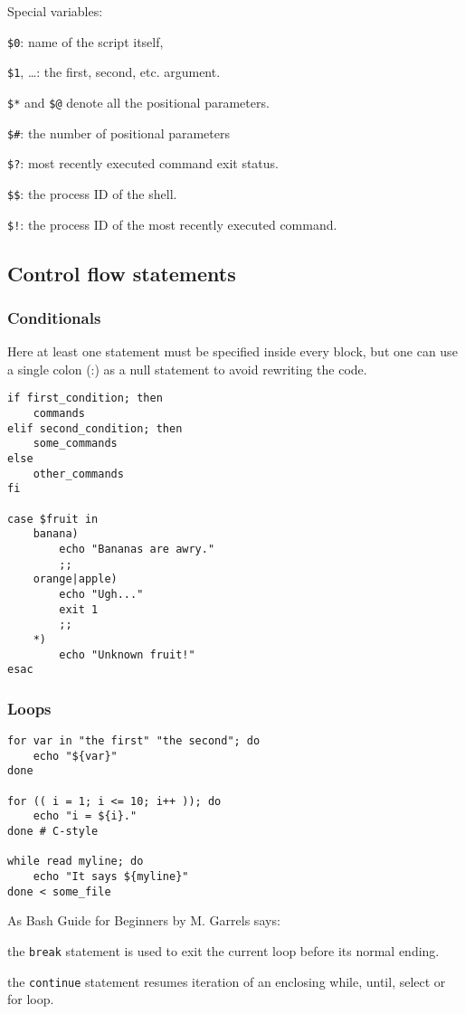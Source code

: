 Special variables:
\begin{enumx}
	\item \texttt{\$0}: name of the script itself,
	\item \texttt{\$1}, \ldots: the first, second, etc. argument.
	\item \texttt{\$*} and \texttt{\$@} denote all the positional parameters.
	\item \texttt{\$\#}: the number of positional parameters
	\item \texttt{\$?}: most recently executed command exit status.
	\item \texttt{\$\$}: the process ID of the shell.
	\item \texttt{\$!}: the process ID of the most recently executed command.
\end{enumx}

\subsection{Control flow statements}
\subsubsection{Conditionals}
Here at least one statement must be specified inside every block,
but one can use a single colon (:) as a null statement to avoid
rewriting the code.

\begin{verbatim}
if first_condition; then
    commands
elif second_condition; then
    some_commands
else
    other_commands	
fi

case $fruit in
    banana)
        echo "Bananas are awry."
        ;;
    orange|apple)
        echo "Ugh..."
        exit 1
        ;;
    *)
        echo "Unknown fruit!"
esac
\end{verbatim}

\subsubsection{Loops}
\begin{verbatim}
for var in "the first" "the second"; do
    echo "${var}"
done

for (( i = 1; i <= 10; i++ )); do
    echo "i = ${i}."
done # C-style

while read myline; do
    echo "It says ${myline}"
done < some_file
\end{verbatim}

As Bash Guide for Beginners by M. Garrels says:
\begin{enumx}
\item the \texttt{break} statement is used to 
exit the current loop before its normal ending. 
\item the \texttt{continue} statement resumes iteration 
of an enclosing while, until, select or for loop.
\end{enumx}


